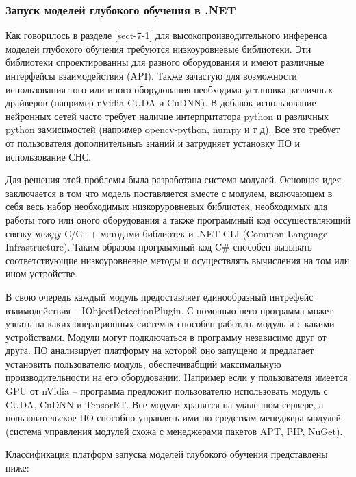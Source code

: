 \subsubsection{Запуск моделей глубокого обучения в .NET}

Как говорилось в разделе \ref{sect-7-1} для высокопроизводительного инференса моделей глубокого обучения требуются низкоуровневые библиотеки. Эти библиотеки спроектированны для разного оборудования и имеют различные интерфейсы взаимодействия (API). Также зачастую для возможности использования того или иного оборудования необходима установка различных драйверов (например nVidia CUDA и CuDNN). В добавок использование нейронных сетей часто требует наличие интерпритатора python и различных python замисимостей (например opencv-python, numpy и т д). Все это требует от пользователя дополнительныъ знаний и затрудняет установку ПО и использование СНС.

Для решения этой проблемы была разработана система модулей. Основная идея заключается в том что модель поставляется вместе с модулем, включающем в себя весь набор необходимых низкоруровневых библиотек, необходимых для работы того или оного оборудования а также программный код оссушествляющий связку между С\slash С++ методами библиотек и .NET CLI (Common Language Infrastructure). Таким образом программный код C\# способен вызывать соответствующие низкоуровневые методы и осуществлять вычисления на том или ином устройстве.

В свою очередь каждый модуль предоставляет единообразный интрефейс взаимодействия -- IObjectDetectionPlugin. С помошью него программа может узнать на каких операционных системах способен работать модуль и с какими устройствами. Модули могут подключаться в программу независимо друг от друга. ПО анализирует платформу на которой оно запущено и предлагает установить пользователю модуль, обеспечивабщий максимальную производительности на его оборудовании. Например если у пользователя имеется GPU от nVidia -- программа предложит пользователю использовать модуль с CUDA, CuDNN и TensorRT. Все модули хранятся на удаленном сервере, а пользовательское ПО способно управлять ими по средствам менеджера модулей (система управления модулей схожа с менеджерами пакетов APT, PIP, NuGet).

Классификация платформ запуска моделей глубокого обучения представлены ниже:

